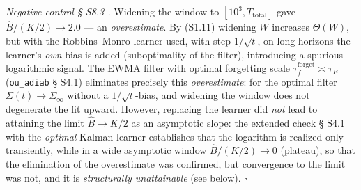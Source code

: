 \documentclass[12pt]{iopart}
\begin{document}
\emph{Negative control § S8.3 \cite{Andriishin2026b}.} Widening the window to \([10^3, T_{\text{total}}]\) gave \(\hat B/(K/2) \to 2.0\) --- an \emph{overestimate}. By (S1.11) widening \(W\) increases \(\Theta(W)\), but with the Robbins--Monro learner used, with step \(1/\sqrt t\), on long horizons the learner's \emph{own} bias is added (suboptimality of the filter), introducing a spurious logarithmic signal. The EWMA filter with optimal forgetting scale \(\tau_f^{\text{forget}} \asymp \tau_E\) (\texttt{ou\_adiab} § S4.1) eliminates precisely this \emph{overestimate}: for the optimal filter \(\Sigma(t) \to \Sigma_\infty\) without a \(1/\sqrt t\)-bias, and widening the window does not degenerate the fit upward. However, replacing the learner did \emph{not} lead to attaining the limit \(\hat B \to K/2\) as an asymptotic slope: the extended check § S4.1 with the \emph{optimal} Kalman learner establishes that the logarithm is realized only transiently, while in a wide asymptotic window \(\hat B/(K/2) \to 0\) (plateau), so that the elimination of the overestimate was confirmed, but convergence to the limit was not, and it is \emph{structurally unattainable} (see below). \(\square\)
\end{document}
